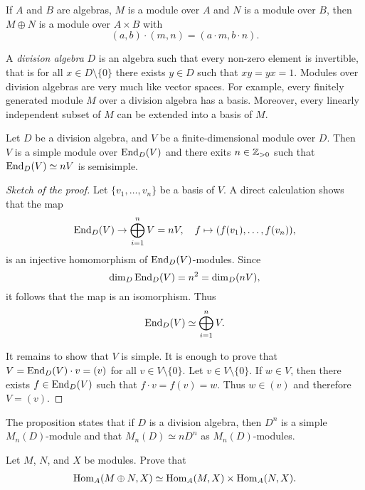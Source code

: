 \section{}


\begin{exercise}
If $A$ and $B$ are algebras, $M$ is a module over $A$ and $N$ is a module over $B$, then 
    $M\oplus N$ is a module over $A\times B$ with 
    \[
    (a,b)\cdot (m,n)=(a\cdot m,b\cdot n).
    \]
\end{exercise}


A \emph{division algebra} $D$ is an algebra such that every non-zero element 
is invertible, that is for all $x\in D\setminus\{0\}$ there exists $y\in D$ such that $xy=yx=1$.  
Modules over division algebras are very much like vector spaces.  For example, 
every finitely generated module $M$ over a division algebra has a basis. 
Moreover, every linearly independent subset of
$M$ can be extended into a basis of $M$. 

\begin{proposition}
	Let $D$ be a division algebra, and $V$ be a finite-dimensional module over $D$. Then 
	$V$ is a simple module over $\operatorname{End}_D(V)$ and there exits $n\in\mathbb{Z}_{>0}$ such that  
	$\operatorname{End}_D(V)\simeq nV$ is semisimple.
\end{proposition}

\begin{proof}[Sketch of the proof]
	Let $\{v_1,\dots,v_n\}$ be a basis of $V$. A direct calculation shows that the map 
	\[
		\operatorname{End}_D(V)\to\bigoplus_{i=1}^nV=nV,\quad
		f\mapsto (f(v_1),\dots,f(v_n)),
	\]
	is an injective homomorphism of $\operatorname{End}_D(V)$-modules.
	Since
	\[
	\dim_D\operatorname{End}_D(V)=n^2=\dim_D(nV),
	\]
	it follows that the map is an isomorphism. 
	Thus 
	\[
		\operatorname{End}_D(V)\simeq \bigoplus_{i=1}^nV.
	\]
	
	It remains to show that $V$ is simple. It is enough to prove that $V=\operatorname{End}_D(V)\cdot v=(v)$ 
	for all $v\in V\setminus\{0\}$. Let $v\in V\setminus\{0\}$. If $w\in V$, then 
	there exists $f\in\operatorname{End}_D(V)$ such that $f\cdot v=f(v)=w$. 
	Thus $w\in (v)$ and therefore $V=(v)$.  
\end{proof}

The proposition states that if $D$ is a division algebra, then  
$D^{n}$ is a simple $M_n(D)$-module and that $M_n(D)\simeq n D^n$ as $M_n(D)$-modules. 

\begin{exercise}
    Let $M$, $N$, and $X$ be modules. Prove that 
    \begin{align}
        \operatorname{Hom}_A(M\oplus N,X)\simeq\operatorname{Hom}_A(M,X)\times\operatorname{Hom}_A(N,X).
    \end{align}
\end{exercise}


